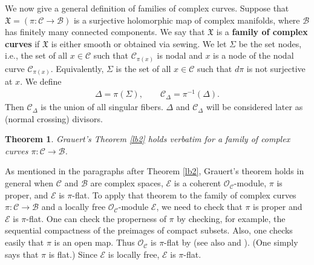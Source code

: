 \documentclass[12pt,b5paper,notitlepage]{report}
\theoremstyle{definition}
\theoremstyle{plain}
\newtheorem{thm}[df]{Theorem}
\newcommand{\fk}{\mathfrak}
\newcommand{\mc}{\mathcal}
\newcommand{\scr}{\mathscr}
\numberwithin{equation}{section}
\begin{document}
We now give a general definition of families of complex curves.   Suppose that $\fk X=(\pi:\mc C\rightarrow \mc B)$ is a surjective holomorphic map of  complex manifolds, where $\mc B$ has finitely many connected components. We say that $\fk X$ is a \textbf{family of complex curves} if  $\fk X$  is  either smooth or obtained via sewing.  
We let $\Sigma$ be the set nodes, i.e., the set of all $x\in\mc C$ such that $\mc C_{\pi(x)}$ is nodal and $x$ is a node of the nodal curve $\mc C_{\pi(x)}$.  Equivalently, $\Sigma$ is the set of all $x\in\mc C$ such that $d\pi$ is not surjective at $x$. We  \index{CDelta@$\mc C_\Delta=\pi^{-1}(\Delta)$}  define
\begin{align*}
\Delta=\pi(\Sigma),\qquad \mc C_\Delta=\pi^{-1}(\Delta).
\end{align*}
Then $\mc C_\Delta$ is the union of all singular fibers. $\Delta$ and $\mc C_\Delta$ will be considered later as (normal crossing) divisors. 

\begin{thm}\label{lb11}
Grauert's Theorem \ref{lb2} holds verbatim for a family of complex curves $\pi:\mc C\rightarrow\mc B$.
\end{thm}


As mentioned in  the paragraphs after Theorem \ref{lb2}, Grauert's theorem holds in general when $\mc C$ and $\mc B$ are complex spaces, $\scr E$ is a coherent $\scr O_{\mc C}$-module, $\pi$ is proper, and $\scr E$ is $\pi$-flat. To apply that theorem to  the family of complex curves $\pi:\mc C\rightarrow\mc B$ and a locally free $\scr O_{\mc C}$-module $\scr E$, we need to check  that $\pi$ is proper and $\scr E$ is $\pi$-flat. One can check the properness of $\pi$ by checking, for example, the sequential compactness of the preimages of  compact subsets. Also, one checks easily that $\pi$ is an open map. Thus $\scr O_{\mc C}$ is $\pi$-flat by  \cite[Sec. 3.20]{Fis76} (see also \cite[Thm. II.2.13]{GPR94} and \cite[Thm. V.2.13]{BS76}). (One simply says that $\pi$ is flat.) Since $\scr E$ is locally free, $\scr E$ is $\pi$-flat.
\end{document}
